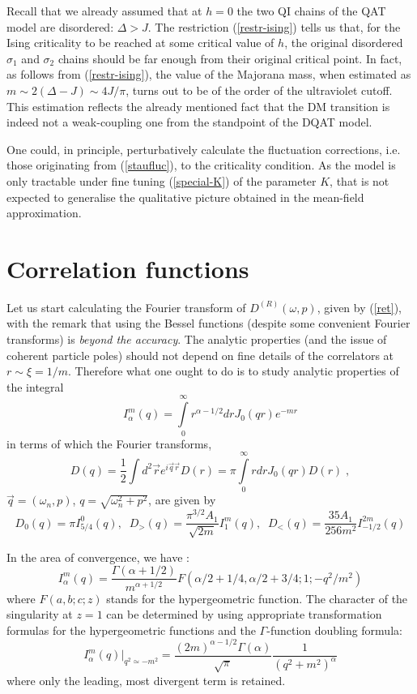 Recall that we already assumed that at $h = 0$ the two QI chains
of the QAT model are disordered: $\Delta > J$.
The restriction (\ref{restr-ising})
tells us that, for the Ising criticality to be reached at some critical value
of $h$, the original disordered $\sigma_1$ and $\sigma_2$ chains should be
far enough from their original critical point. In fact, as follows from
(\ref{restr-ising}), the value of the Majorana mass, when estimated as
$m \sim 2(\Delta - J) \sim 4J/\pi$, turns out to be of the order of the
ultraviolet cutoff. This estimation reflects the already mentioned fact that
the DM transition is
indeed not a weak-coupling one from the standpoint of the
DQAT model.

One could, in principle, perturbatively calculate the
fluctuation corrections, i.e. those originating from (\ref{staufluc}),
to the criticality condition.
As the model is only tractable
under fine tuning (\ref{special-K}) of the parameter $K$,
that is not expected to generalise the qualitative picture obtained in the
mean-field approximation.

\newpage
\section{Correlation functions}
\label{corrf}

Let us start calculating the Fourier transform of $D^{(R)}(\omega,p)$,
given by (\ref{ret}),
with the remark that using the Bessel
functions (despite some convenient Fourier transforms)
is {\sl beyond the accuracy}. The analytic properties
(and the issue of coherent particle poles) should not
depend on fine details of the correlators at
$r\sim \xi=1/m$.
Therefore what one ought to do is to study analytic
properties of the integral
\begin{equation}
I^m_\alpha(q)=\int\limits_0^\infty r^{\alpha-1/2} dr
J_0(qr)e^{-mr}
\label{int}
\end{equation}
in terms of which the Fourier transforms,
\[
D(q)=\frac{1}{2}\int d^2\vec{r}
e^{i\vec{q}\vec{r}}D(r)=
\pi\int\limits_0^\infty r drJ_0(qr) D(r)\;,
\]
$\vec{q}=(\omega_n,p)$, $q=\sqrt{\omega_n^2+p^2}$, are
given by
\begin{equation}
D_0(q)=\pi I^0_{5/4}(q),\;\;
D_>(q)=\frac{\pi^{3/2}A_1}{\sqrt{2m}}I^m_1(q),\;\;
D_<(q)=\frac{35A_1}{256 m^2}I^{2m}_{-1/2}(q)
\label{DI}
\end{equation}

In the area of convergence, we have \cite{GR}:
\begin{equation}
I^m_\alpha(q)=\frac{\Gamma(\alpha+1/2)}{m^{\alpha+1/2}}
F(\alpha/2+1/4,\alpha/2+3/4;1;-q^2/m^2)
\label{Igen}
\end{equation}
where $F(a,b;c;z)$ stands for the hypergeometric
function.
The character of the singularity at $z=1$ can be
determined by using appropriate transformation
formulas for the hypergeometric functions
and the $\Gamma$-function doubling formula\cite{GR}:
\begin{equation}
I^m_\alpha(q)|_{q^2\simeq -m^2}=
\frac{(2m)^{\alpha-1/2}\Gamma(\alpha)}{\sqrt{\pi}}
\frac{1}{(q^2+m^2)^\alpha}
\label{Idiv}
\end{equation}
where only the leading, most divergent term is
retained.

